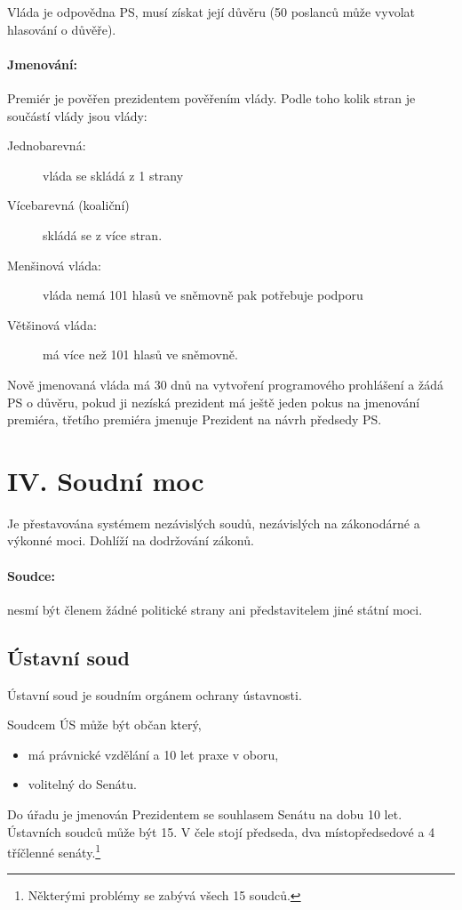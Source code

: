 \documentclass[10pt,a4paper,
twoside,%
]{report}
\begin{document}
Vláda je odpovědna PS, musí získat její důvěru (50 poslanců může vyvolat hlasování o důvěře).

\paragraph{Jmenování:} Premiér je pověřen prezidentem pověřením vlády. Podle toho kolik stran je součástí vlády jsou vlády:
\begin{description}
\item[Jednobarevná:]vláda se skládá z 1 strany
\item[Vícebarevná (koaliční)] skládá se z více stran.
\item[Menšinová vláda:] vláda nemá 101 hlasů ve sněmovně pak potřebuje podporu
\item[Většinová vláda:] má více než 101 hlasů ve sněmovně.
 
\end{description}

Nově jmenovaná vláda má 30 dnů na vytvoření programového prohlášení a žádá PS o důvěru, pokud ji nezíská prezident má ještě jeden pokus na jmenování premiéra, třetího premiéra jmenuje Prezident na návrh předsedy PS.

\section[IV. hlava]{IV. Soudní moc}
Je přestavována systémem nezávislých soudů, nezávislých na zákonodárné a výkonné moci. Dohlíží na dodržování zákonů.

\paragraph{Soudce:} nesmí být členem žádné politické strany ani představitelem jiné státní moci.

\subsection{Ústavní soud}
Ústavní soud je soudním orgánem ochrany ústavnosti.

Soudcem ÚS může být občan který,\begin{itemize}
\item má právnické vzdělání a 10 let praxe v oboru,
\item volitelný do Senátu.
\end{itemize}

Do úřadu je jmenován Prezidentem se souhlasem Senátu na dobu 10 let. Ústavních soudců může být 15. V čele stojí předseda, dva místopředsedové a 4 tříčlenné senáty.\footnote{Některými problémy se zabývá všech 15 soudců.}
\end{document}
